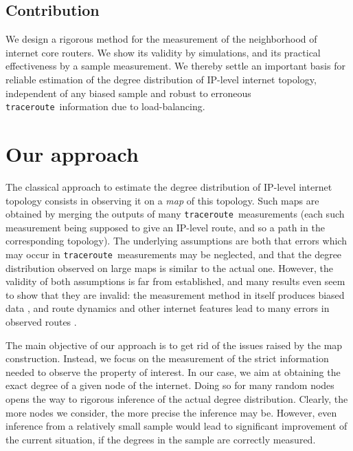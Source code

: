 \documentclass[conference]{IEEEtran}
\newcommand{\traceroute}{{\tt traceroute}}
\begin{document}
\subsection*{Contribution}
We design a rigorous method for the measurement of the neighborhood of internet core routers. We show its validity by simulations, and its practical effectiveness by a sample measurement. We thereby settle an important basis for reliable estimation of the degree distribution of IP-level internet topology, independent of any biased sample and robust to erroneous \traceroute\ information due to load-balancing.




\section{Our approach}\label{sec-approach}

The classical approach to estimate the degree distribution of IP-level internet topology consists in observing it on a {\em map} of this topology. Such maps are obtained by merging the outputs of many \traceroute\ measurements (each such measurement being supposed to give an IP-level route, and so a path in the corresponding topology). The underlying assumptions are both that errors which may occur in \traceroute\ measurements may be neglected, and that the degree distribution observed on large maps is similar to the actual one. However, the validity of both assumptions is far from established, and many results even seem to show that they are invalid: the measurement method in itself produces biased data \cite{DBLP:conf/infocom/LakhinaBCX03,DBLP:journals/jacm/AchlioptasCKM09,DBLP:journals/tcs/DallAstaABVV06,DBLP:conf/infocom/GuillaumeL05,DBLP:journals/cn/GuillaumeLM06,DBLP:conf/infocom/LatapyM08}, and route dynamics and other internet features lead to many errors in observed routes \cite{willinger,DBLP:conf/sigcomm/SherwoodBS08,DBLP:journals/ton/SpringMWA04,DBLP:journals/cn/VigerACMLFT08,DBLP:conf/imc/AugustinCOVFLMT06}.


The main objective of our approach is to get rid of the issues raised by the map construction. Instead, we focus on the measurement of the strict information needed to observe the property of interest. In our case, we aim at obtaining the exact degree of a given node of the internet. Doing so for many random nodes opens the way to rigorous inference of the actual degree distribution. Clearly, the more nodes we consider, the more precise the inference may be. However, even inference from a relatively small sample would lead to significant improvement of the current situation, if the degrees in the sample are correctly measured.
\end{document}
